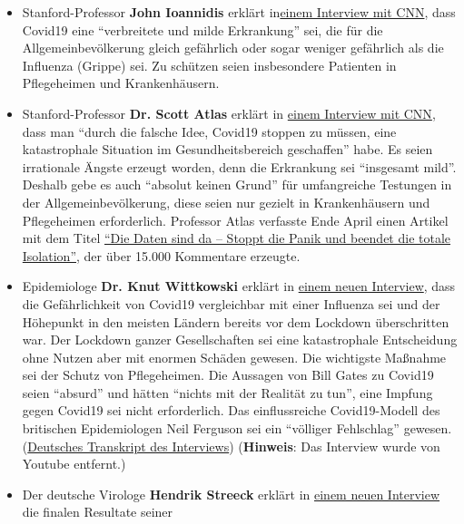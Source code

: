\begin{itemize}
\tightlist
\item
  Stanford-Professor \textbf{John Ioannidis} erklärt
  in\href{https://twitter.com/cnn/status/1256579248342564865}{einem
  Interview mit CNN}, dass Covid19 eine ``verbreitete und milde
  Erkrankung'' sei, die für die Allgemeinbevölkerung gleich gefährlich
  oder sogar weniger gefährlich als die Influenza (Grippe) sei. Zu
  schützen seien insbesondere Patienten in Pflegeheimen und
  Krankenhäusern.
\item
  Stanford-Professor \textbf{Dr. Scott Atlas} erklärt in
  \href{https://www.facebook.com/cnn/posts/10160799274796509}{einem
  Interview mit CNN}, dass man ``durch die falsche Idee, Covid19 stoppen
  zu müssen, eine katastrophale Situation im Gesundheitsbereich
  geschaffen'' habe. Es seien irrationale Ängste erzeugt worden, denn
  die Erkrankung sei ``insgesamt mild''. Deshalb gebe es auch ``absolut
  keinen Grund'' für umfangreiche Testungen in der Allgemeinbevölkerung,
  diese seien nur gezielt in Krankenhäusern und Pflegeheimen
  erforderlich. Professor Atlas verfasste Ende April einen Artikel mit
  dem Titel
  \href{https://thehill.com/opinion/healthcare/494034-the-data-are-in-stop-the-panic-and-end-the-total-isolation}{``Die
  Daten sind da -- Stoppt die Panik und beendet die totale Isolation''},
  der über 15.000 Kommentare erzeugte.
\item
  Epidemiologe \textbf{Dr. Knut Wittkowski} erklärt in
  \href{https://www.thepressandthepublic.com/post/perspectives-on-the-pandemic-v}{einem
  neuen Interview}, dass die Gefährlichkeit von Covid19 vergleichbar mit
  einer Influenza sei und der Höhepunkt in den meisten Ländern bereits
  vor dem Lockdown überschritten war. Der Lockdown ganzer Gesellschaften
  sei eine katastrophale Entscheidung ohne Nutzen aber mit enormen
  Schäden gewesen. Die wichtigste Maßnahme sei der Schutz von
  Pflegeheimen. Die Aussagen von Bill Gates zu Covid19 seien ``absurd''
  und hätten ``nichts mit der Realität zu tun'', eine Impfung gegen
  Covid19 sei nicht erforderlich. Das einflussreiche Covid19-Modell des
  britischen Epidemiologen Neil Ferguson sei ein ``völliger Fehlschlag''
  gewesen.
  (\href{https://vitalstoff.blog/2020/05/01/wir-brauchen-keinen-impfstoff/}{Deutsches
  Transkript des Interviews}) (\textbf{Hinweis}: Das Interview wurde von
  Youtube entfernt.)
\item
  Der deutsche Virologe \textbf{Hendrik Streeck} erklärt in
  \href{https://www.youtube.com/watch?v=vrL9QKGQrWk}{einem neuen
  Interview} die finalen Resultate seiner

\end{itemize}
